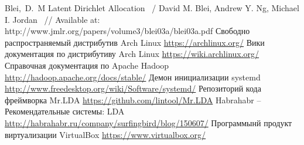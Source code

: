 \renewcommand{\bibname}{Список используемой литературы}
\begin{thebibliography}{10}
     Blei,~D.~M Latent Dirichlet Allocation ~/ David M. Blei, Andrew Y. Ng, Michael I. Jordan ~//
        Available at: http://www.jmlr.org/papers/volume3/blei03a/blei03a.pdf
     Свободно распространяемый дистрибутив Arch Linux \url{https://archlinux.org/}
     Вики документация по дистрибутиву Arch Linux \url{https://wiki.archlinux.org/}
     Справочная документация по Apache Hadoop \url{http://hadoop.apache.org/docs/stable/}
     Демон инициализации systemd \url{http://www.freedesktop.org/wiki/Software/systemd/}
     Репозиторий кода фреймворка Mr.LDA \url{https://github.com/lintool/Mr.LDA}
     Habrahabr -- Рекомендательные системы: LDA \url{http://habrahabr.ru/company/surfingbird/blog/150607/}
     Программынй продукт виртуализации VirtualBox \url{https://www.virtualbox.org/}
\end{thebibliography}